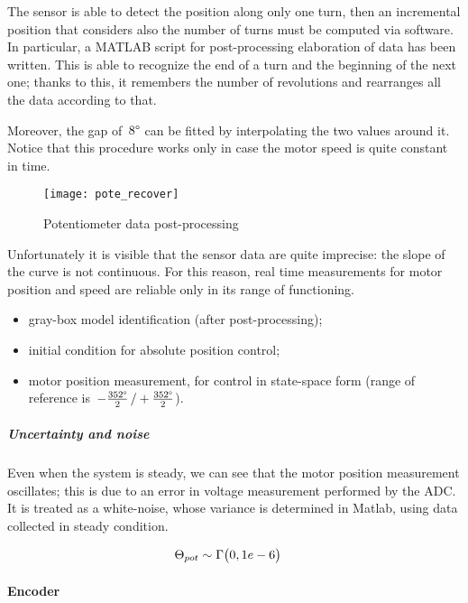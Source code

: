The sensor is able to detect the position along only one turn, then an incremental position that considers also the number of turns must be computed via software.
In particular, a MATLAB script for post-processing elaboration of data has been written. This is able to recognize the end of a turn and the beginning of the next one; thanks to this, it remembers the number of revolutions and rearranges all the data according to that.

Moreover, the gap of~$8 \degree$ can be fitted by interpolating the two values around it. Notice that this procedure works only in case the motor speed is quite constant in time.
\begin{figure*}[h]
	\centering
	\texttt{[image: pote\_recover]}
	\caption{Potentiometer data post-processing}
\end{figure*}

Unfortunately it is visible that the sensor data are quite imprecise: the slope of the curve is not continuous. For this reason, real time measurements for motor position and speed are reliable only in its range of functioning.
\begin{itemize}
	\item gray-box model identification (after post-processing);
	\item initial condition for absolute position control;
	\item motor position measurement, for control in state-space form (range of reference is~$-\frac{352 \degree}{2} \, / +\frac{352 \degree}{2}$).
\end{itemize}

\subparagraph{Uncertainty and noise}
Even when the system is steady, we can see that the motor position measurement oscillates; this is due to an error in voltage measurement performed by the ADC. It is treated as a white-noise, whose variance is determined in Matlab, using data collected in steady condition.

\begin{align*}
	\Theta_{pot} &\sim \Gamma \bigl{(} 0, 1e-6 \bigr{)}
\end{align*}

\paragraph{Encoder}

